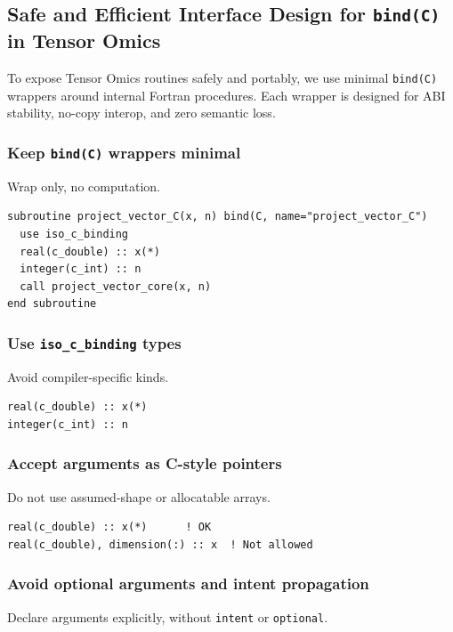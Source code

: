 \documentclass{article}
\begin{document}
\subsection{Safe and Efficient Interface Design for \texttt{bind(C)} in Tensor Omics}

To expose Tensor Omics routines safely and portably, we use minimal \texttt{bind(C)} wrappers around internal Fortran procedures. Each wrapper is designed for ABI stability, no-copy interop, and zero semantic loss.

\subsubsection{Keep \texttt{bind(C)} wrappers minimal}

Wrap only, no computation.

\begin{verbatim}
subroutine project_vector_C(x, n) bind(C, name="project_vector_C")
  use iso_c_binding
  real(c_double) :: x(*)
  integer(c_int) :: n
  call project_vector_core(x, n)
end subroutine
\end{verbatim}

\subsubsection{Use \texttt{iso\_c\_binding} types}

Avoid compiler-specific kinds.

\begin{verbatim}
real(c_double) :: x(*)
integer(c_int) :: n
\end{verbatim}

\subsubsection{Accept arguments as C-style pointers}

Do not use assumed-shape or allocatable arrays.

\begin{verbatim}
real(c_double) :: x(*)      ! OK
real(c_double), dimension(:) :: x  ! Not allowed
\end{verbatim}

\subsubsection{Avoid optional arguments and intent propagation}

Declare arguments explicitly, without \texttt{intent} or \texttt{optional}.
\end{document}
